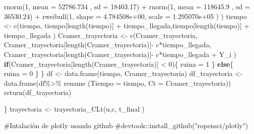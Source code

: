 \documentclass[
  us-letterpaper,
]{scrreprt}
\newenvironment{Shaded}{\begin{snugshade}}{\end{snugshade}}
\newcommand{\AttributeTok}[1]{\textcolor[rgb]{0.40,0.45,0.13}{#1}}
\newcommand{\CommentTok}[1]{\textcolor[rgb]{0.37,0.37,0.37}{#1}}
\newcommand{\ControlFlowTok}[1]{\textcolor[rgb]{0.00,0.23,0.31}{\textbf{#1}}}
\newcommand{\DecValTok}[1]{\textcolor[rgb]{0.68,0.00,0.00}{#1}}
\newcommand{\FloatTok}[1]{\textcolor[rgb]{0.68,0.00,0.00}{#1}}
\newcommand{\FunctionTok}[1]{\textcolor[rgb]{0.28,0.35,0.67}{#1}}
\newcommand{\NormalTok}[1]{\textcolor[rgb]{0.00,0.23,0.31}{#1}}
\newcommand{\OtherTok}[1]{\textcolor[rgb]{0.00,0.23,0.31}{#1}}
\newcommand{\SpecialCharTok}[1]{\textcolor[rgb]{0.37,0.37,0.37}{#1}}
\theoremstyle{plain}
\theoremstyle{plain}
\theoremstyle{definition}
\theoremstyle{remark}
\begin{document}
\begin{Shaded}
\begin{Highlighting}[]
            \FunctionTok{rnorm}\NormalTok{(}\DecValTok{1}\NormalTok{, }\AttributeTok{mean =} \FloatTok{52786.734}\NormalTok{  , }\AttributeTok{sd =} \FloatTok{18403.17}\NormalTok{)  }\SpecialCharTok{+} 
            \FunctionTok{rnorm}\NormalTok{(}\DecValTok{1}\NormalTok{, }\AttributeTok{mean =} \FloatTok{118645.9}\NormalTok{  , }\AttributeTok{sd =} \FloatTok{36530.24}\NormalTok{)   }\SpecialCharTok{+} 
    \FunctionTok{rweibull}\NormalTok{(}\DecValTok{1}\NormalTok{,  }\AttributeTok{shape =} \FloatTok{4.784508e+00}\NormalTok{, }\AttributeTok{scale =} \FloatTok{1.295070e+05}\NormalTok{ ) ) }
\NormalTok{    tiempo }\OtherTok{\textless{}{-}} \FunctionTok{c}\NormalTok{(tiempo, tiempo[}\FunctionTok{length}\NormalTok{(tiempo)] }\SpecialCharTok{+}
\NormalTok{                  tiempo\_llegada,tiempo[}\FunctionTok{length}\NormalTok{(tiempo)] }\SpecialCharTok{+}
\NormalTok{                  tiempo\_llegada ) }
\NormalTok{    Cramer\_trayectoria }\OtherTok{\textless{}{-}} \FunctionTok{c}\NormalTok{(Cramer\_trayectoria,}
\NormalTok{           Cramer\_trayectoria[}\FunctionTok{length}\NormalTok{(Cramer\_trayectoria)]}\SpecialCharTok{{-}} 
\NormalTok{                              c}\SpecialCharTok{*}\NormalTok{tiempo\_llegada,}
\NormalTok{          Cramer\_trayectoria[}\FunctionTok{length}\NormalTok{(Cramer\_trayectoria)]}\SpecialCharTok{{-}}
\NormalTok{                              c}\SpecialCharTok{*}\NormalTok{tiempo\_llegada }\SpecialCharTok{+}\NormalTok{  Y\_i )}
    \ControlFlowTok{if}\NormalTok{(Cramer\_trayectoria[}\FunctionTok{length}\NormalTok{(Cramer\_trayectoria)] }\SpecialCharTok{\textless{}} \DecValTok{0}\NormalTok{)\{}
\NormalTok{      ruina }\OtherTok{=} \DecValTok{1}
\NormalTok{    \}}
    \ControlFlowTok{else}\NormalTok{\{}
\NormalTok{      ruina }\OtherTok{=} \DecValTok{0}
\NormalTok{    \}}
\NormalTok{  \}}
\NormalTok{  df }\OtherTok{\textless{}{-}} \FunctionTok{data.frame}\NormalTok{(tiempo, Cramer\_trayectoria)}
\NormalTok{  df\_trayectoria }\OtherTok{\textless{}{-}} \FunctionTok{data.frame}\NormalTok{(df}\SpecialCharTok{\%\textgreater{}\%}\NormalTok{ rename}
\NormalTok{                               (}\AttributeTok{Tiempo =}\NormalTok{ tiempo, }
                                 \AttributeTok{Ct =}\NormalTok{ Cramer\_trayectoria))}
  \FunctionTok{return}\NormalTok{(df\_trayectoria)}
  
\NormalTok{\}}
\NormalTok{trayectoria }\OtherTok{\textless{}{-}} \FunctionTok{trayectoria\_CLt}\NormalTok{(u,c, t\_final )}

\CommentTok{\#Intalación de plotly usando github}
\CommentTok{\#devtools::install\_github("ropensci/plotly")}


\end{Highlighting}
\end{Shaded}
\end{document}
